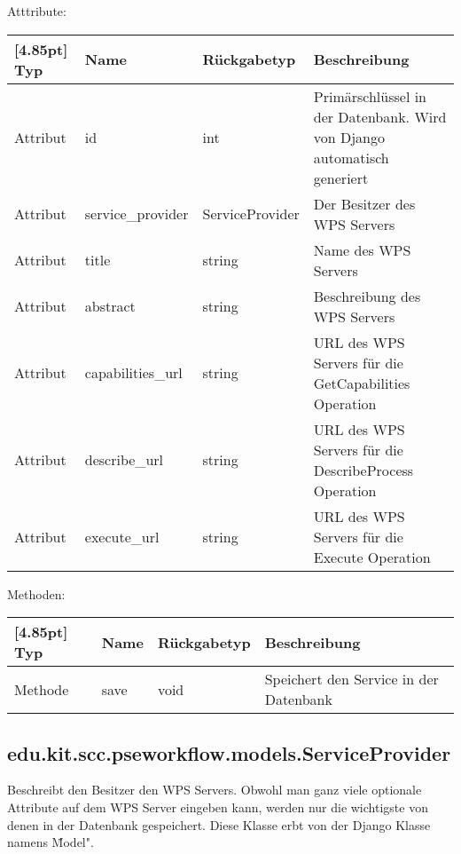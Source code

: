 			Atttribute:
			\begin{center}
				\setlength\tabcolsep{5pt}
				\renewcommand{\arraystretch}{1.5}
				
				\begin{tabularx}{\textwidth}{|l|l|l|X|}
					\hline
					\rowcolor[gray]{0.75}[4.85pt]
					Typ & Name & Rückgabetyp & Beschreibung \\ \hline 
					Attribut & id & int & Primärschlüssel in der Datenbank. Wird von Django automatisch generiert \\ \hline
					Attribut & service\_provider & ServiceProvider & Der Besitzer des WPS Servers \\ \hline
					Attribut & title & string & Name des WPS Servers \\ \hline
					Attribut & abstract & string & Beschreibung des WPS Servers \\ \hline
					Attribut & capabilities\_url & string & URL des WPS Servers für die GetCapabilities Operation \\ \hline
					Attribut & describe\_url & string & URL des WPS Servers für die DescribeProcess Operation \\ \hline
					Attribut & execute\_url & string & URL des WPS Servers für die Execute Operation \\ \hline
					
				\end{tabularx}
			\end{center}
			
			Methoden:
			\begin{center}
				\setlength\tabcolsep{5pt}
				\renewcommand{\arraystretch}{1.5}
				
				\begin{tabularx}{\textwidth}{|l|l|l|X|}
					\hline
					\rowcolor[gray]{0.75}[4.85pt]
					Typ & Name & Rückgabetyp & Beschreibung \\ \hline 
					Methode & save & void & Speichert den Service in der Datenbank \\
					\hline
				\end{tabularx}
			\end{center}

        \subsection{edu.kit.scc.pseworkflow.models.ServiceProvider}
			Beschreibt den Besitzer den WPS Servers. Obwohl man ganz viele optionale Attribute auf dem WPS Server eingeben kann, werden nur die wichtigste von denen in der Datenbank gespeichert. \newline
			Diese Klasse erbt von der Django Klasse namens \"Model".
			
